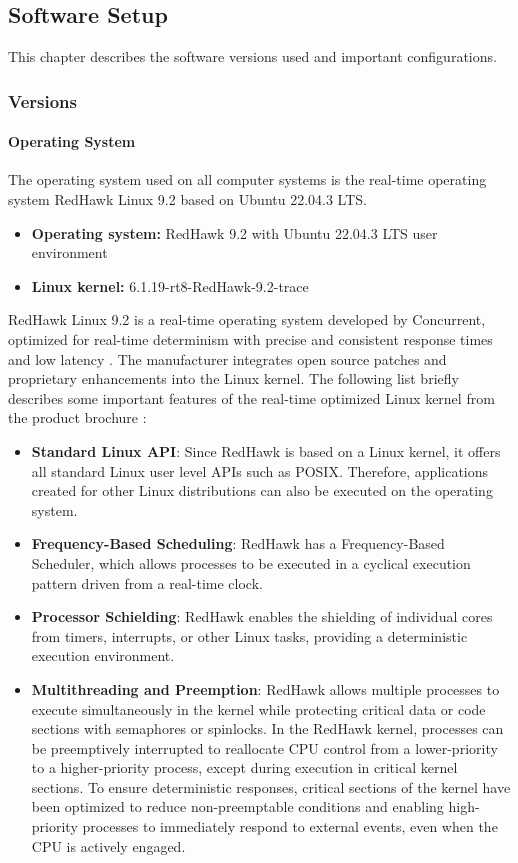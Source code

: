 \subsection{Software Setup}
This chapter describes the software versions used and important configurations.

\subsubsection{Versions}
\paragraph{Operating System}
The operating system used on all computer systems is the real-time operating system RedHawk Linux 9.2 based on Ubuntu 22.04.3 LTS.

\begin{itemize}
\item \textbf{Operating system:} RedHawk 9.2 with Ubuntu 22.04.3 LTS user environment
\item \textbf{Linux kernel:} 6.1.19-rt8-RedHawk-9.2-trace
\end{itemize}

RedHawk Linux 9.2 is a real-time operating system developed by Concurrent, optimized for real-time determinism with precise and consistent response times and low latency \cite{swsetup01}. The manufacturer integrates open source patches and proprietary enhancements into the Linux kernel. The following list briefly describes some important features of the real-time optimized Linux kernel from the product brochure \cite{swsetup02}:

\begin{itemize}
\item \textbf{Standard Linux API}: Since RedHawk is based on a Linux kernel, it offers all standard Linux user level APIs such as POSIX. Therefore, applications created for other Linux distributions can also be executed on the operating system.
\item \textbf{Frequency-Based Scheduling}: RedHawk has a Frequency-Based Scheduler, which allows processes to be executed in a cyclical execution pattern driven from a real-time clock.
\item \textbf{Processor Schielding}: RedHawk enables the shielding of individual cores from timers, interrupts, or other Linux tasks, providing a deterministic execution environment.
\item \textbf{Multithreading and Preemption}: RedHawk allows multiple processes to execute simultaneously in the kernel while protecting critical data or code sections with semaphores or spinlocks. In the RedHawk kernel, processes can be preemptively interrupted to reallocate CPU control from a lower-priority to a higher-priority process, except during execution in critical kernel sections. To ensure deterministic responses, critical sections of the kernel have been optimized to reduce non-preemptable conditions and enabling high-priority processes to immediately respond to external events, even when the CPU is actively engaged.
\end{itemize}

